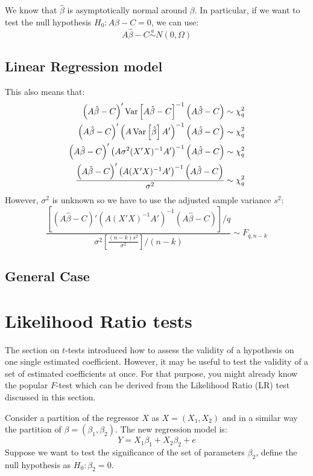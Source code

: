 We know that $\hat\beta$ is asymptotically normal around $\beta$. In particular, if we want to test the null hypothesis $H_0:A\beta - C = 0$, we can use: $$ A\hat\beta - C \overset{a}{\sim} N(0,\Omega) $$ 

\subsection{Linear Regression model}

This also means that:\begin{align*}
\left(A\hat\beta - C\right)'\operatorname{Var}\left[A\hat\beta - C\right]^{-1}\left(A\hat\beta - C\right) & \sim \chi_q^2 \\
\left(A\hat\beta - C\right)'\left(A\operatorname{Var}\left[\hat\beta\right]A'\right)^{-1}\left(A\hat\beta - C\right) & \sim \chi_q^2 \\
\left(A\hat\beta - C\right)'\left(A\sigma^2(X'X)^{-1}A'\right)^{-1}\left(A\hat\beta - C\right) & \sim \chi_q^2 \\
\frac{\left(A\hat\beta - C\right)'\left(A(X'X)^{-1}A'\right)^{-1}\left(A\hat\beta - C\right)}{\sigma^2} & \sim \chi_q^2 \\
\end{align*} However, $\sigma^2$ is unknown so we have to use the adjusted sample variance $s^2$: $$ \frac{\left[\left(A\hat\beta - C\right)'\left(A(X'X)^{-1}A'\right)^{-1}\left(A\hat\beta - C\right)\right]/q}{\sigma^2\left[\frac{(n-k)s^2}{\sigma^2}\right]/(n-k)} \sim F_{q, n-k} $$

\subsection{General Case}

\section{Likelihood Ratio tests}

The section on $t$-tests introduced how to assess the validity of a hypothesis on one single estimated coefficient. However, it may be useful to test the validity of a set of estimated coefficients at once. For that purpose, you might already know the popular $F$-test which can be derived from the Likelihood Ratio (LR) test discussed in this section.

Consider a partition of the regressor $X$ as $X = (X_1, X_2)$ and in a similar way the partition of $\beta = (\beta_1, \beta_2)$. The new regression model is: $$ Y = X_1\beta_1 + X_2\beta_2 + e $$ Suppose we want to test the significance of the set of parameters $\beta_2$, define the null hypothesis as $H_0 : \beta_2 = 0$.

